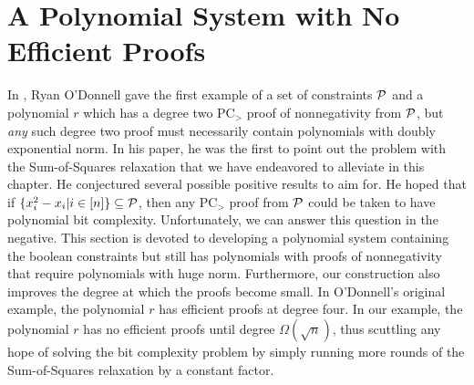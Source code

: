 \section{A Polynomial System with No Efficient Proofs}
In \cite{}, Ryan O'Donnell gave the first example of a set of constraints $\mathcal P$ and a polynomial $r$ which has a degree two PC$_>$ proof of nonnegativity from $\mathcal P$, but \emph{any} such degree two proof must necessarily contain polynomials with doubly exponential norm. In his paper, he was the first to point out the problem with the Sum-of-Squares relaxation that we have endeavored to alleviate in this chapter. He conjectured several possible positive results to aim for. He hoped that if $\{x_i^2 - x_i | i \in [n]\} \subseteq \mathcal P$, then any PC$_>$ proof from $\mathcal P$ could be taken to have polynomial bit complexity. Unfortunately, we can answer this question in the negative. This section is devoted to developing a polynomial system containing the boolean constraints but still has polynomials with proofs of nonnegativity that require polynomials with huge norm. Furthermore, our construction also improves the degree at which the proofs become small. In O'Donnell's original example, the polynomial $r$ has efficient proofs at degree four. In our example, the polynomial $r$ has no efficient proofs until degree $\Omega(\sqrt{n})$, thus scuttling any hope of solving the bit complexity problem by simply running more rounds of the Sum-of-Squares relaxation by a constant factor.

